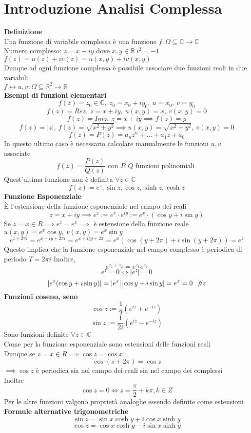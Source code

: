 \documentclass[a4paper]{article}
\begin{document}
\section{Introduzione Analisi Complessa}
\textbf{Definizione}
\\Una funzione di variabile complessa è una funzione $f:\Omega\subseteq \mathbb{C}\to \mathbb{C}$
\\Numero complesso: $z=x+iy$ dove $x,y\in \mathbb{R}\ i^{2}=-1$
\\$f(z)=u(z)+iv(z)=u(x,y)+iv(x,y)$
\\Dunque ad ogni funzione complessa è possibile associare due funzioni reali in due variabili
\\$f\leftrightarrow u,v:\Omega\subseteq \mathbb{R}^2\to \mathbb{R}$
\\\textbf{Esempi di funzioni elementari}
\[
	f(z)=z_0\in\mathbb{C},\ z_0=x_0+iy_0,\ u=x_0,\  v=y_0
\]
\[
	f(z)=Rez,\  z=x+iy,\  u(x,y)=x
	,\ v(x,y)=0
\]
\[
	f(z)=Imz,\ z=x+iy\implies f(z)=y
\]
\[
	f(z)=|z|,\ f(z)=\sqrt{x^2+y^2} \implies u(x,y)=\sqrt{x^2+y^2} , \ v(x,y)=0
\]
\[
	f(z)=P(z)=a_nz^n+\ldots+a_1z+a_0
\]
In questo ultimo caso è necessario calcolare manualmente le funzioni $u,v$ associate
\[
	f(z)=\frac{P(z)}{Q(z)} \text{ con } P,Q \text{ funzioni polinomiali }
\]
Quest'ultima funzione non è definita $\forall z \in \mathbb{C}$
\[
	f(z)=e^z, \sin z, \cos z, \sinh z, \cosh z
\]
\textbf{Funzione Esponenziale}
\\È l'estensione della funzione esponenziale nel campo dei reali
\[
	z=x+iy\implies e^z:=e^x\cdot e^{iy}:=e^x\cdot(\cos y+i\sin y)
\]
Se $z=x\in R \implies e^z=e^x\implies$ è estensione della funzione reale
\\$u(x,y)=e^x \cos y,\ v(x,y)=e^x\sin y $
\[ e^{z+2\pi i}=e ^{x+iy+2\pi i}=e ^{x + i(y +2 \pi }=e^x(\cos (y+2 \pi)+i \sin (y+2 \pi))=e^z\]
Questo implica che la funzione esponenziale nel campo complesso è periodica di periodo $T=2 \pi i$
Inoltre,
\[e^{z_1+z_2}=e^{z_1}e^{z_2}
\]
\[
	e^z=0\iff|e^z|=0
\]
\[	
	|e^x(\cos y + i \sin y)|=|e^x| |\cos y +i\sin y|=e^x=0\ \not\forall z  
\]
\textbf{Funzioni coseno, seno}
\[\cos z:=\frac{1}{2}(e^{iz}+e^{-iz})\]
\[\sin z:=\frac{1}{2i}(e^{iz}-e^{-iz})\]
Sono funzioni definite $\forall z\in \mathbb C$
\\Come per la funzione esponenziale sono estensioni delle funzioni reali
\\Dunque se $z=x\in R \implies \cos z = \cos x$
\[\cos(z+2\pi)=\cos z\]
$\implies \cos z$ è periodica sia nel campo dei reali sia nel campo dei complessi
\\Inoltre
\[\cos z =0\iff z=\frac{\pi}{2}+k\pi,k\in Z\]
Per le altre funzioni valgono proprietà analoghe essendo definite come estensioni
\\\textbf{Formule alternative trigonometriche}
\[\sin z= \sin x \cosh y + i \cos x \sinh y\]
\[\cos z = \cos x \cosh y - i \sin x \sinh y\]
\end{document}
